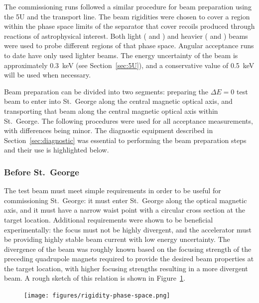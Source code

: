 The commissioning runs followed a similar procedure for beam preparation
using the 5U and the transport line. The beam rigidities were chosen to
cover a region within the phase space limits of the separator that cover
recoils produced through reactions of astrophysical interest. Both light
( and ) and heavier ( and )
beams were used to probe different regions of that phase space. Angular
acceptance runs to date have only used lighter beams. The energy
uncertainty of the beam is approximately 0.3~keV (see
Section~\ref{sec:5U}), and a conservative value of 0.5~keV will be used
when necessary.

Beam preparation can be divided into two segments: preparing the $\Delta
E = 0$ test beam to enter into St.\ George along the central magnetic
optical axis, and transporting that beam along the central magnetic
optical axis within St.\ George. The following procedures were used for
all acceptance measurements, with differences being minor. The
diagnostic equipment described in Section~\ref{sec:diagnostic} was
essential to performing the beam preparation steps and their use is
highlighted below.

\subsubsection{Before St.\ George}

The test beam must meet simple requirements in order to be useful for
commissioning St.\ George: it must enter St.\ George along the optical
magnetic axis, and it must have a narrow waist point with a circular
cross section at the target location. Additional requirements were shown
to be beneficial experimentally: the focus must not be highly divergent,
and the accelerator must be providing highly stable beam current with
low energy uncertainty. The divergence of the beam was roughly known
based on the focusing strength of the preceding quadrupole magnets
required to provide the desired beam properties at the target location,
with higher focusing strengths resulting in a more divergent beam. A
rough sketch of this relation is shown in Figure~\ref{fig:divergence}.

\begin{figure}[t]
   \begin{center}
       \centerline{\texttt{[image: figures/rigidity-phase-space.png]}}
       \caption[Sketch of beam divergence due to focusing strength]{}
       \label{fig:divergence}
   \end{center}
\end{figure}

